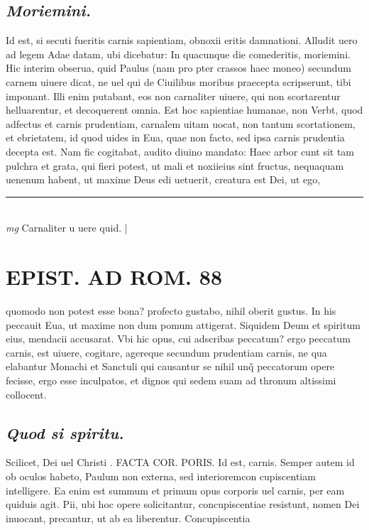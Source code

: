 \documentclass{article}
\begin{document}
\begin{pages}
\subsection*{\textit{Moriemini. }}\pstart Id est, si secuti fueritis carnis sapientiam, obnoxii eritis damnationi. Alludit uero ad legem Adae datam, ubi dicebatur: In quacunque die comederitis, moriemini. Hic interim obserua, quid Paulus (nam pro pter crassos haec moneo) secundum carnem uiuere dicat, ne uel qui de Ciuilibus moribus praecepta scripserunt, tibi imponant. Illi enim putabant, eos non carnaliter uiuere, qui non scortarentur helluarentur, et decoquerent omnia. Est hoc sapientiae humanae, non Verbt, quod adfectus et carnis prudentiam, carnalem uitam uocat, non tantum scortationem, et ebrietatem, id quod uides in Eua, quae non facto, sed ipsa carnis prudentia decepta est. Nam fic cogitabat, audito diuino mandato: Haec arbor cunt sit tam pulchra et grata, qui fieri potest, ut mali et noxiieius sint fructus, nequaquam uenenum habent, ut maxime Deus edi uetuerit, creatura est Dei, ut ego,  \pend
\vspace{0.5cm}\noindent
\vspace{0.2cm}\rule{1cm}{0.2pt}\\ 
\hspace{0.2cm}\textit{mg}
\footnotesize Carnaliter u uere quid. 
\normalsize| 
\section*{EPIST. AD ROM.  88 }
\marginpar{[ p.]}\pstart quomodo non potest esse bona? profecto gustabo, nihil oberit gustus. In his peccauit Eua, ut maxime non dum pomum attigerat. Siquidem Deum et spiritum eius, mendacii accusarat. Vbi hic opus, cui adscribas peccatum? ergo peccatum carnis, est uiuere, cogitare, agereque secundum prudentiam carnis, ne qua elabantur Monachi et Sanctuli qui causantur se nihil unq̃ peccatorum opere fecisse, ergo esse inculpatos, et dignos qui sedem suam ad thronum altissimi collocent.   \pend
{}
{}
\subsection*{\textit{Quod si spiritu. }}\pstart Scilicet, Dei uel Christi . FACTA COR.  PORIS. Id est, carnis. Semper autem id ob oculos habeto, Paulum non externa, sed interioremcon cupiscentiam intelligere. Ea enim est summum et primum opus corporis uel carnis, per eam quiduis agit.  Pii, ubi hoc opere solicitantur, concupiscentiae resistunt, nomen Dei inuocant, precantur, ut ab ea liberentur.  Concupiscentia  \pend
{}
{}

\end{pages}
\end{document}
